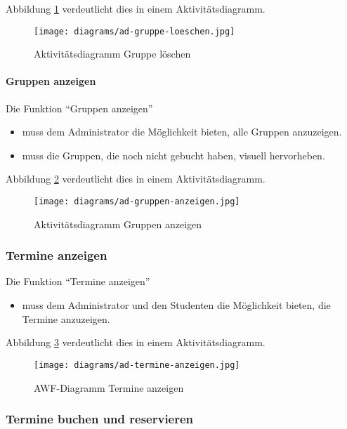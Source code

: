Abbildung \ref{fig:ad-gruppe-loeschen} verdeutlicht dies in einem Aktivitätsdiagramm.

\begin{figure}
  \centering
  \texttt{[image: diagrams/ad-gruppe-loeschen.jpg]}
  \caption{Aktivitätsdiagramm Gruppe löschen}
  \label{fig:ad-gruppe-loeschen}
\end{figure}

\paragraph{Gruppen anzeigen}

Die Funktion ``Gruppen anzeigen''
\begin{itemize}
  \item muss dem Administrator die Möglichkeit bieten, alle Gruppen anzuzeigen.
  \item muss die Gruppen, die noch nicht gebucht haben, visuell hervorheben.
\end{itemize}

Abbildung \ref{fig:ad-gruppen-anzeigen} verdeutlicht dies in einem Aktivitätsdiagramm.

\begin{figure}
  \centering
  \texttt{[image: diagrams/ad-gruppen-anzeigen.jpg]}
  \caption{Aktivitätsdiagramm Gruppen anzeigen}
  \label{fig:ad-gruppen-anzeigen}
\end{figure}

\subsubsection{Termine anzeigen}

Die Funktion ``Termine anzeigen''
\begin{itemize}
  \item muss dem Administrator und den Studenten die Möglichkeit bieten, die Termine anzuzeigen.
\end{itemize}

Abbildung \ref{fig:ad-termine-anzeigen} verdeutlicht dies in einem Aktivitätsdiagramm.

\begin{figure}
  \centering
  \texttt{[image: diagrams/ad-termine-anzeigen.jpg]}
  \caption{AWF-Diagramm Termine anzeigen}
  \label{fig:ad-termine-anzeigen}
\end{figure}

\subsubsection{Termine buchen und
reservieren}

